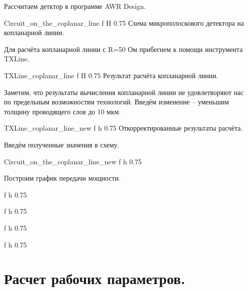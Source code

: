 \documentclass{bmstu}
\begin{document}
	
\indent	Рассчитаем детктор в программе AWR Design.

	{Circuit_on_the_coplanar_line}
	{f} %
	{H} %
	{0.75\textwidth} %
	{Схема микрополоскового детектора на копланарной линии.} %

	Для расчёта копланарной линии с R=50 Ом прибегнем к помощи инструмента TXLine.
	
	{TXLine_coplanar_line}
	{f} %
	{H} %
	{0.75\textwidth} %
	{Результат расчёта копланарной линии.} %

	Заметим, что результаты вычисления копланарной линии не удовлетворяют нас по
	предельным возможностям технологий. Введём изменение – уменьшим толщину
	проводящего слоя до 10 мкм.

	{TXLine_coplanar_line_new}
	{f} %
	{h} %
	{0.75\textwidth} %
	{Откорректированные результаты расчёта.} %
	
	Введём полученные значения в схему.
	
	{Circuit_on_the_coplanar_line_new}
	{f} %
	{h} %
	{0.75\textwidth} %
	{} %

	Построим график передачи мощности.
	
	{}
	{f} %
	{h} %
	{0.75\textwidth} %
	{} %

	{}
	{f} %
	{h} %
	{0.75\textwidth} %
	{} %

	{}
	{f} %
	{h} %
	{0.75\textwidth} %
	{} %

	{}
	{f} %
	{h} %
	{0.75\textwidth} %
	{} %

	\chapter{Расчет рабочих параметров.}
	
\end{document}
